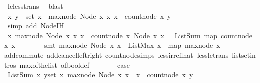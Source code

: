 \begin{isabellebody}
\ le{\isacharunderscore}less{\isacharunderscore}trans\ \isamarkupfalse%
\ blast\ \ \isanewline
\ \ \ \ \isamarkupfalse%
\ \isamarkupfalse%
\ {\isachardoublequoteopen}{\isasymforall}x{\isachardot}\ {\isasymforall}y\ {\isasymin}\ set\ x{}\ {\isachardot}\ max{\isacharunderscore}node\ {\isacharparenleft}Node\ x{}\ x{}{\isacharparenright}{\isacharless}\ x\ {\isasymlongrightarrow}\ count{\isacharunderscore}node\ x\ y\ {\isacharequal}\ {}{\isachardoublequoteclose}\isanewline
\ \ \ \ \ \ \isamarkupfalse%
\ {\isacharparenleft}simp\ add{\isacharcolon}\ Node{\isachardot}IH{\isacharparenright}\isanewline
\ \ \ \ \isamarkupfalse%
\ \isamarkupfalse%
\ {\isachardoublequoteopen}{\isasymforall}x{\isachardot}\ max{\isacharunderscore}node\ {\isacharparenleft}Node\ x{}\ x{}{\isacharparenright}{\isacharless}\ x\ {\isasymlongrightarrow}\ count{\isacharunderscore}node\ x\ {\isacharparenleft}Node\ x{}\ x{}{\isacharparenright}\ {\isacharequal}\ \ ListSum\ {\isacharparenleft}map\ {\isacharparenleft}count{\isacharunderscore}node\ x{\isacharparenright}\ x{}{\isacharparenright}{\isachardoublequoteclose}\isanewline
\ \ \ \ \ \ \isamarkupfalse%
\ {\isacharparenleft}smt\ {\isacartoucheopen}max{\isacharunderscore}node\ {\isacharparenleft}Node\ x{}\ x{}{\isacharparenright}\ {\isacharequal}\ ListMax\ {\isacharparenleft}x{}\ {\isacharhash}\ map\ max{\isacharunderscore}node\ x{}{\isacharparenright}{\isacartoucheclose}\ \isanewline
add{\isachardot}commute\ add{\isacharunderscore}cancel{\isacharunderscore}left{\isacharunderscore}right\ count{\isacharunderscore}node{\isachardot}simps{\isacharparenleft}{}{\isacharparenright}\ less{\isacharunderscore}irrefl{\isacharunderscore}nat\ less{\isacharunderscore}le{\isacharunderscore}trans\ list{\isachardot}set{\isacharunderscore}intros{\isacharparenleft}{}{\isacharparenright}\ max{\isacharunderscore}of{\isacharunderscore}the{\isacharunderscore}list\ of{\isacharunderscore}bool{\isacharunderscore}def{\isacharparenright}\isanewline
\ \ \ \ \isamarkupfalse%
\ \isamarkupfalse%
\ {\isacharquery}case\isanewline
\ \ \ \ \ \ \isamarkupfalse%
\ ListSum{\isacharunderscore}{}\ {\isacartoucheopen}{\isasymforall}x{\isachardot}\ {\isasymforall}y{\isasymin}set\ x{}{\isachardot}\ max{\isacharunderscore}node\ {\isacharparenleft}Node\ x{}\ x{}{\isacharparenright}\ {\isacharless}\ x\ {\isasymlongrightarrow}\ count{\isacharunderscore}node\ x\ y\ {\isacharequal}\ {}{\isacartoucheclose}\ \isamarkupfalse%

\end{isabellebody}
